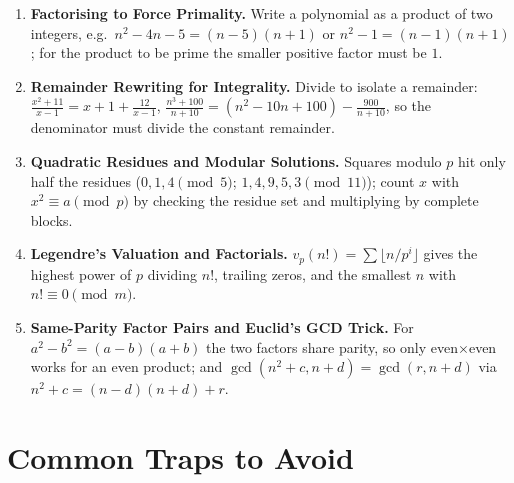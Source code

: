 \documentclass[11pt,a4paper]{article}
\begin{document}
\begin{enumerate}[leftmargin=2em, itemsep=4pt]
  \item \textbf{Factorising to Force Primality.}
        Write a polynomial as a product of two integers, e.g.\ $n^{2}-4n-5=(n-5)(n+1)$ or $n^{2}-1=(n-1)(n+1)$; for the product to be prime the smaller positive factor must be $1$. 
  \item \textbf{Remainder Rewriting for Integrality.}
        Divide to isolate a remainder: $\frac{x^{2}+11}{x-1}=x+1+\frac{12}{x-1}$, $\frac{n^{3}+100}{n+10}=(n^{2}-10n+100)-\frac{900}{n+10}$, so the denominator must divide the constant remainder. 
  \item \textbf{Quadratic Residues and Modular Solutions.}
        Squares modulo $p$ hit only half the residues ($0,1,4\pmod5$; $1,4,9,5,3\pmod{11}$); count $x$ with $x^{2}\equiv a\pmod p$ by checking the residue set and multiplying by complete blocks. 
  \item \textbf{Legendre's Valuation and Factorials.}
        $v_{p}(n!)=\sum\lfloor n/p^{i}\rfloor$ gives the highest power of $p$ dividing $n!$, trailing zeros, and the smallest $n$ with $n!\equiv0\pmod m$. 
  \item \textbf{Same-Parity Factor Pairs and Euclid's GCD Trick.}
        For $a^{2}-b^{2}=(a-b)(a+b)$ the two factors share parity, so only even$\times$even works for an even product; and $\gcd(n^{2}+c,n+d)=\gcd(r,n+d)$ via $n^{2}+c=(n-d)(n+d)+r$. 
\end{enumerate}

\section*{Common Traps to Avoid}
\end{document}
